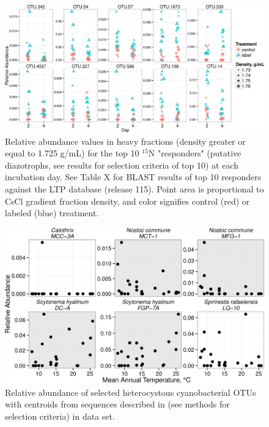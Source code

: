 \begin{figure}[h!]
  \centering
    \includegraphics[width=1.0\textwidth]{figures/scatter_heavy_topN2/scatter_heavy_topN.png}
  \caption{Relative abundance values in heavy fractions (density greater or equal to 1.725 g/mL) for the top 10 $^{15}$N "responders" (putative diazotrophs, see results for selection criteria of top 10) at each incubation day. See Table X for BLAST results of top 10 responders against the LTP database (release 115). Point area is proportional to CsCl gradient fraction density, and color signifies control (red) or labeled (blue) treatment.}
  \label{fig:scatter_heavy}
\end{figure}

\begin{figure}[h!]
  \centering
    \includegraphics[width=1.0\textwidth]{figures/het_cyano_temp/het_cyano_temp.png}
  \caption{Relative abundance of selected heterocystous cyanobacterial OTUs with centroids from sequences described in \citet{Yeager} (see methods for selection criteria) in \citet{Steven_2013} data set.}
  \label{fig:het_temp}
\end{figure}

